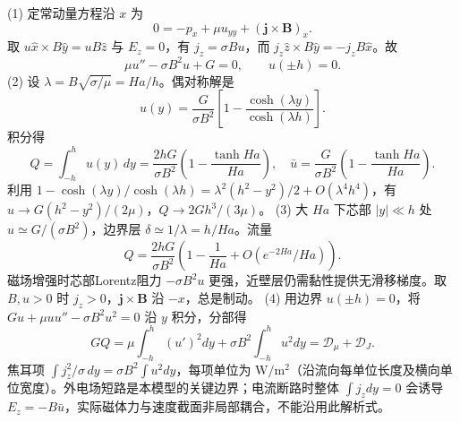 (1) 定常动量方程沿 \(x\) 为
\[
0=-p_x+\mu u_{yy}+(\boldsymbol j\times\boldsymbol B)_x.
\]
取 \(u\hat x\times B\hat y=uB\hat z\) 与 \(E_z=0\)，有 \(j_z=\sigma Bu\)，而 \(j_z\hat z\times B\hat y=-j_zB\hat x\)。故
\[
\mu u''-\sigma B^2u+G=0,\qquad u(\pm h)=0.
\]
(2) 设 \(\lambda=B\sqrt{\sigma/\mu}=Ha/h\)。偶对称解是
\[
u(y)=\frac G{\sigma B^2}\left[1-\frac{\cosh(\lambda y)}{\cosh(\lambda h)}\right].
\]
积分得
\[
Q=\int_{-h}^h u(y)\,dy
=\frac{2hG}{\sigma B^2}\left(1-\frac{\tanh Ha}{Ha}\right),\quad
\bar u=\frac G{\sigma B^2}\left(1-\frac{\tanh Ha}{Ha}\right).
\]
利用 \(1-\cosh(\lambda y)/\cosh(\lambda h)=\lambda^2(h^2-y^2)/2+O(\lambda^4h^4)\)，有 \(u\to G(h^2-y^2)/(2\mu)\)，\(Q\to2Gh^3/(3\mu)\)。
(3) 大 \(Ha\) 下芯部 \(|y|\ll h\) 处 \(u\simeq G/(\sigma B^2)\)，边界层 \(\delta\simeq1/\lambda=h/Ha\)。流量
\[
Q=\frac{2hG}{\sigma B^2}\left(1-\frac1{Ha}+O(e^{-2Ha}/Ha)\right).
\]
磁场增强时芯部Lorentz阻力 \(-\sigma B^2u\) 更强，近壁层仍需黏性提供无滑移梯度。取 \(B,u>0\) 时 \(j_z>0\)，\(\boldsymbol j\times\boldsymbol B\) 沿 \(-x\)，总是制动。
(4) 用边界 \(u(\pm h)=0\)，将 \(Gu+\mu uu''-\sigma B^2u^2=0\) 沿 \(y\) 积分，分部得
\[
GQ=\mu\int_{-h}^h(u')^2dy+
\sigma B^2\int_{-h}^h u^2dy
=\mathcal D_\mu+\mathcal D_J.
\]
焦耳项 \(\int j_z^2/\sigma\,dy=\sigma B^2\int u^2dy\)，每项单位为 \(\mathrm{W/m^2}\)（沿流向每单位长度及横向单位宽度）。外电场短路是本模型的关键边界；电流断路时整体 \(\int j_zdy=0\) 会诱导 \(E_z=-B\bar u\)，实际磁体力与速度截面非局部耦合，不能沿用此解析式。
